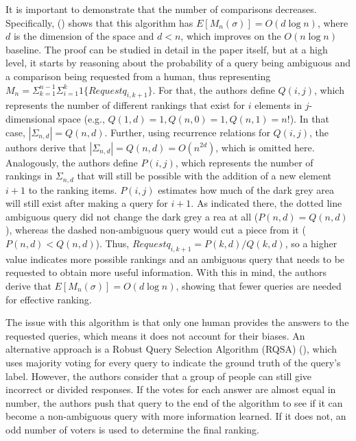 \documentclass[
  letterpaper,
  numbers=noenddot,
  DIV=11]{scrreprt}
\theoremstyle{plain}
\theoremstyle{definition}
\theoremstyle{remark}
\begin{document}
It is important to demonstrate that the number of comparisons decreases.
Specifically, () shows that
this algorithm has \(E[M_n(\sigma)] = O(d\log n)\), where \(d\) is the
dimension of the space and \(d < n\), which improves on the
\(O(n\log n)\) baseline. The proof can be studied in detail in the paper
itself, but at a high level, it starts by reasoning about the
probability of a query being ambiguous and a comparison being requested
from a human, thus representing
\(M_n = \Sigma_{k=1}^{n-1}\Sigma_{i=1}^k 1\{Requestq_{i,k+1}\}\). For
that, the authors define \(Q(i,j)\), which represents the number of
different rankings that exist for \(i\) elements in \(j\)-dimensional
space (e.g., \(Q(1,d) = 1, Q(n,0) = 1, Q(n,1) = n!\)). In that case,
\(|\Sigma_{n,d}| = Q(n,d)\). Further, using recurrence relations for
\(Q(i,j)\), the authors derive that
\(|\Sigma_{n,d}| = Q(n,d) = O(n^{2d})\), which is omitted here.
Analogously, the authors define \(P(i,j)\), which represents the number
of rankings in \(\Sigma_{n,d}\) that will still be possible with the
addition of a new element \(i+1\) to the ranking items. \(P(i,j)\)
estimates how much of the dark grey area will still exist after making a
query for \(i+1\). As indicated there, the dotted line ambiguous query
did not change the dark grey a rea at all (\(P(n,d) = Q(n,d)\)), whereas
the dashed non-ambiguous query would cut a piece from it
(\(P(n,d) < Q(n,d)\)). Thus, \(Request q_{i,k+1} = P(k,d) / Q(k,d)\), so
a higher value indicates more possible rankings and an ambiguous query
that needs to be requested to obtain more useful information. With this
in mind, the authors derive that \(E[M_n(\sigma)] = O(d\log n)\),
showing that fewer queries are needed for effective ranking.

The issue with this algorithm is that only one human provides the
answers to the requested queries, which means it does not account for
their biases. An alternative approach is a Robust Query Selection
Algorithm (RQSA) (), which
uses majority voting for every query to indicate the ground truth of the
query's label. However, the authors consider that a group of people can
still give incorrect or divided responses. If the votes for each answer
are almost equal in number, the authors push that query to the end of
the algorithm to see if it can become a non-ambiguous query with more
information learned. If it does not, an odd number of voters is used to
determine the final ranking.
\end{document}
